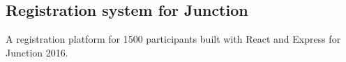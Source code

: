 \documentclass[]{deedy-resume}
\begin{document}
\begin{minipage}[t]{0.66\textwidth}
\subsection{Registration system for Junction}
A registration platform for 1500 participants built with React and Express for Junction 2016. 
\sectionsep



% 
% 

\end{minipage} 
\end{document}
